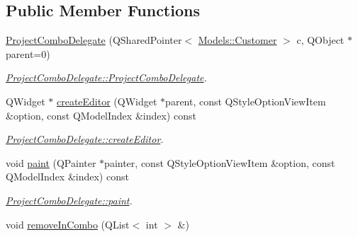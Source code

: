 \subsection*{Public Member Functions}
\begin{DoxyCompactItemize}
\item 
\hyperlink{classGui_1_1Widgets_1_1Delegates_1_1ProjectComboDelegate_a5fda87c3db87a0928717810a0ac2812f}{Project\-Combo\-Delegate} (Q\-Shared\-Pointer$<$ \hyperlink{classModels_1_1Customer}{Models\-::\-Customer} $>$ c, Q\-Object $\ast$parent=0)
\begin{DoxyCompactList}\small\item\em \hyperlink{classGui_1_1Widgets_1_1Delegates_1_1ProjectComboDelegate_a5fda87c3db87a0928717810a0ac2812f}{Project\-Combo\-Delegate\-::\-Project\-Combo\-Delegate}. \end{DoxyCompactList}\item 
Q\-Widget $\ast$ \hyperlink{classGui_1_1Widgets_1_1Delegates_1_1ProjectComboDelegate_adbfc28a3e6de34dc63d7290ae5b5c053}{create\-Editor} (Q\-Widget $\ast$parent, const Q\-Style\-Option\-View\-Item \&option, const Q\-Model\-Index \&index) const 
\begin{DoxyCompactList}\small\item\em \hyperlink{classGui_1_1Widgets_1_1Delegates_1_1ProjectComboDelegate_adbfc28a3e6de34dc63d7290ae5b5c053}{Project\-Combo\-Delegate\-::create\-Editor}. \end{DoxyCompactList}\item 
void \hyperlink{classGui_1_1Widgets_1_1Delegates_1_1ProjectComboDelegate_a20cbc84d26b83083fdf7efecae3407cf}{paint} (Q\-Painter $\ast$painter, const Q\-Style\-Option\-View\-Item \&option, const Q\-Model\-Index \&index) const 
\begin{DoxyCompactList}\small\item\em \hyperlink{classGui_1_1Widgets_1_1Delegates_1_1ProjectComboDelegate_a20cbc84d26b83083fdf7efecae3407cf}{Project\-Combo\-Delegate\-::paint}. \end{DoxyCompactList}\item 
\hypertarget{classGui_1_1Widgets_1_1Delegates_1_1ProjectComboDelegate_a7e14627b3942a96f190e31a4e67edc95}{void \hyperlink{classGui_1_1Widgets_1_1Delegates_1_1ProjectComboDelegate_a7e14627b3942a96f190e31a4e67edc95}{remove\-In\-Combo} (Q\-List$<$ int $>$ \&)}\label{classGui_1_1Widgets_1_1Delegates_1_1ProjectComboDelegate_a7e14627b3942a96f190e31a4e67edc95}


\end{DoxyCompactItemize}
